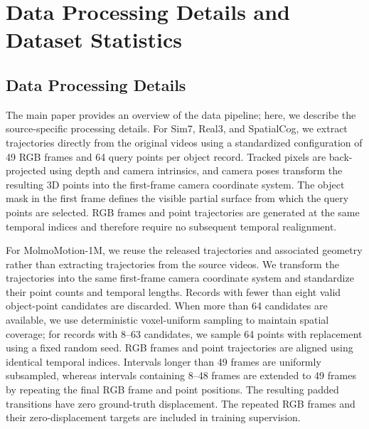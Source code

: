
\section{Data Processing Details and Dataset Statistics}
\label{sec:supp-data}

\subsection{Data Processing Details}

The main paper provides an overview of the data pipeline;
here, we describe the source-specific processing details.
For Sim7, Real3, and SpatialCog, we extract trajectories
directly from the original videos using a standardized
configuration of 49 RGB frames and 64 query points per
object record.
Tracked pixels are back-projected using depth and camera
intrinsics, and camera poses transform the resulting 3D
points into the first-frame camera coordinate system.
The object mask in the first frame defines the visible
partial surface from which the query points are selected.
RGB frames and point trajectories are generated at the
same temporal indices and therefore require no subsequent
temporal realignment.

For MolmoMotion-1M, we reuse the released trajectories and
associated geometry rather than extracting trajectories
from the source videos.
We transform the trajectories into the same first-frame
camera coordinate system and standardize their point
counts and temporal lengths.
Records with fewer than eight valid object-point candidates
are discarded.
When more than 64 candidates are available, we use
deterministic voxel-uniform sampling to maintain spatial
coverage; for records with 8--63 candidates, we sample
64 points with replacement using a fixed random seed.
RGB frames and point trajectories are aligned using
identical temporal indices.
Intervals longer than 49 frames are uniformly subsampled,
whereas intervals containing 8--48 frames are extended
to 49 frames by repeating the final RGB frame and point
positions.
The resulting padded transitions have zero ground-truth
displacement.
The repeated RGB frames and their zero-displacement
targets are included in training supervision.


